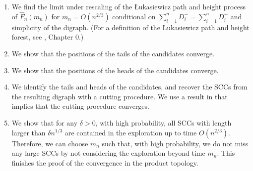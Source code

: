 \begin{enumerate}
    \item We find the limit under rescaling of the \L ukasiewicz path and height process of $\hat{F}_n(m_n)$ for $m_n=O(n^{2/3})$ conditional on $\sum_{i=1}^n D^-_i=\sum_{i=1}^n D^+_i$ and simplicity of the digraph. (For a definition of the \L ukasiewicz path and height forest, see \cite{AST_2002__281__R1_0}, Chapter 0.)
    \item We show that the positions of the tails of the candidates converge.
    \item We show that the positions of the heads of the candidates converge.
    \item We identify the tails and heads of the candidates, and recover the SCCs from the resulting digraph with a cutting procedure. We use a result in \cite{goldschmidtScalingLimitCritical2019} that implies that the cutting procedure converges.
    \item We show that for any $\delta>0$, with high probability, all SCCs with length larger than $\delta n^{1/3}$ are contained in the exploration up to time $O(n^{2/3})$. Therefore, we can choose $m_n$ such that, with high probability, we do not miss any large SCCs by not considering the exploration beyond time $m_n$. This finishes the proof of the convergence in the product topology.
\end{enumerate}

